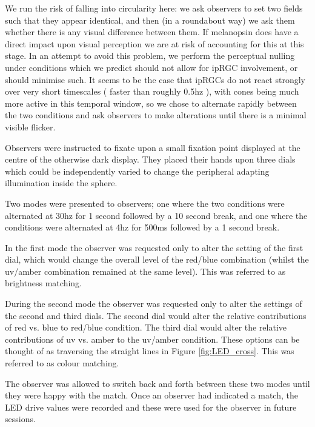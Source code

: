 We run the risk of falling into circularity here: we ask observers to set two fields such that they appear identical, and then (in a roundabout way) we ask them whether there is any visual difference between them. If melanopsin does have a direct impact upon visual perception we are at risk of accounting for this at this stage. In an attempt to avoid this problem, we perform the perceptual nulling under conditions which we predict should not allow for \gls{ipRGC} involvement, or should minimise such. It seems to be the case that \glspl{ipRGC} do not react strongly over very short timescales ( faster than roughly 0.5hz \citep{spitschan_human_2017-1}), with cones being much more active in this temporal window, so we chose to alternate rapidly between the two conditions and ask observers to make alterations until there is a minimal visible flicker.

Observers were instructed to fixate upon a small fixation point displayed at the centre of the otherwise dark display. They placed their hands upon three dials which could be independently varied to change the peripheral adapting illumination inside the sphere.

Two modes were presented to observers; one where the two conditions were alternated at 30hz for 1 second followed by a 10 second break, and one where the conditions were alternated at 4hz for 500ms followed by a 1 second break. 

In the first mode the observer was requested only to alter the setting of the first dial, which would change the overall level of the red/blue combination (whilst the uv/amber combination remained at the same level). This was referred to as brightness matching.

During the second mode the observer was requested only to alter the settings of the second and third dials. The second dial would alter the relative contributions of red vs. blue to red/blue condition. The third dial would alter the relative contributions of uv vs. amber to the uv/amber condition. These options can be thought of as traversing the straight lines in Figure \ref{fig:LED_cross}. This was referred to as colour matching.


The observer was allowed to switch back and forth between these two modes until they were happy with the match. Once an observer had indicated a match, the LED drive values were recorded and these were used for the observer in future sessions.

